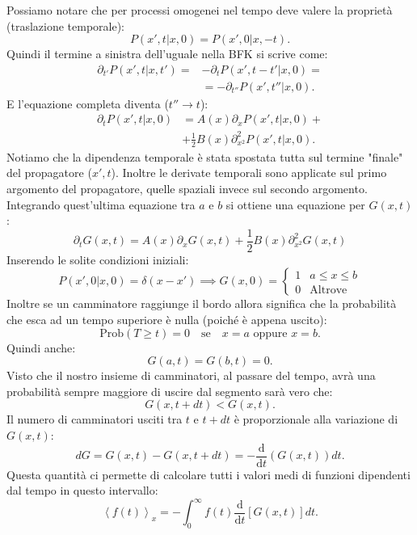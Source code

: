 Possiamo notare che per processi omogenei nel tempo deve valere la proprietà (traslazione temporale):
\[
    P\left(x',t|x,0\right) = P\left(x',0|x, -t\right) 
.\] 
Quindi il termine a sinistra dell'uguale nella BFK si scrive come:
\[\begin{aligned}
    \partial_{t'}P\left(x',t|x,t'\right) =& -\partial_{t}P(x',t-t'|x,0) = \\
					  & = -\partial_{t''}P\left(x',t''|x,0\right)
.\end{aligned}\]
E l'equazione completa diventa ($t''\to t$):
\[\begin{aligned}
    \partial_{t}P\left(x',t|x,0\right) &= A(x) \partial_{x}P\left(x',t|x,0\right) + \\
				       & + \frac{1}{2}B(x) \partial^2_{x^2}P\left(x',t|x,0\right)
.\end{aligned}\]
Notiamo che la dipendenza temporale è stata spostata tutta sul termine "finale" del propagatore ($x',t$). Inoltre le derivate temporali sono applicate sul primo argomento del propagatore, quelle spaziali invece sul secondo argomento.\\
Integrando quest'ultima equazione tra $a$ e $b$ si ottiene una equazione per $G(x,t)$:
\begin{equation}
    \partial_{t}G(x,t) = A(x) \partial_{x}G(x,t) + \frac{1}{2}B(x) \partial^2_{x^2}G(x,t) 
    \label{eq:11_G_diff}
\end{equation}
Inserendo le solite condizioni iniziali: 
\[
    P(x',0|x,0) = \delta (x-x') \implies 
    G(x,0) = 
    \begin{cases}
	1 & a\le x\le b\\
	0 &\text{Altrove}
    \end{cases}
\] 
Inoltre se un camminatore raggiunge il bordo allora significa che la probabilità che esca ad un tempo superiore è nulla (poiché è appena uscito):
\[
    \text{Prob}(T\ge t) = 0 \quad \text{se} \quad x = a \text{ oppure } x = b
.\] 
Quindi anche:
\[
    G(a,t) = G(b,t) = 0
.\] 
Visto che il nostro insieme di camminatori, al passare del tempo, avrà una probabilità sempre maggiore di uscire dal segmento sarà vero che:
\[
    G(x, t+dt) < G(x,t)
.\] 
Il numero di camminatori usciti tra $t$ e $t+dt$ è proporzionale alla variazione di $G(x, t)$:
\[
    dG = G(x,t)-G(x,t+dt) = -\frac{\text{d} }{\text{d} t}(G(x,t)) dt
.\] 
Questa quantità ci permette di calcolare tutti i valori medi di funzioni dipendenti dal tempo in questo intervallo:
\[
    \left<f(t) \right>_x = -\int_{0}^{\infty} f(t) \frac{\text{d} }{\text{d} t} \left[G(x,t) \right]dt 
.\] 
